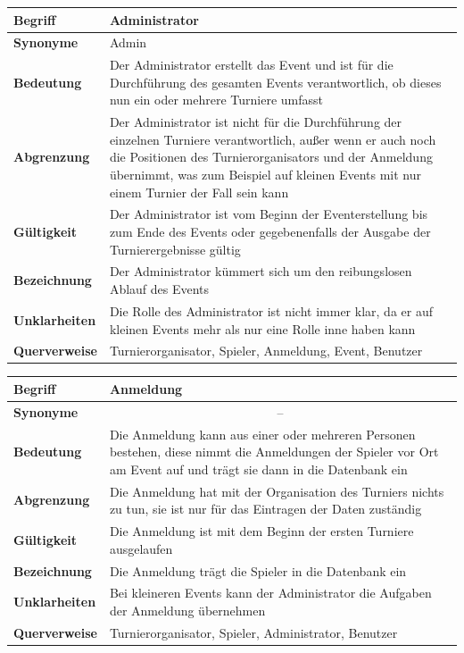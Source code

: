 \documentclass[11pt]{article}
\begin{document}
\begin{tabularx}{\textwidth}{| p{} | p{} |}
	\hline
	\textbf{Begriff} & Administrator\\
	\hline
	\textbf{Synonyme} & Admin\\
	\hline
	\textbf{Bedeutung} & Der Administrator erstellt das Event und ist für die Durchführung des gesamten Events verantwortlich, ob dieses nun ein oder mehrere Turniere umfasst\\
	\hline
	\textbf{Abgrenzung} & Der Administrator ist nicht für die Durchführung der einzelnen Turniere verantwortlich, außer wenn er auch noch die Positionen des Turnierorganisators und der Anmeldung übernimmt, was zum Beispiel auf kleinen Events mit nur einem Turnier der Fall sein kann\\
	\hline
	\textbf{Gültigkeit} & Der Administrator ist vom Beginn der Eventerstellung bis zum Ende des Events oder gegebenenfalls der Ausgabe der Turnierergebnisse gültig\\
	\hline
	\textbf{Bezeichnung} & Der Administrator kümmert sich um den reibungslosen Ablauf des Events\\
	\hline
	\textbf{Unklarheiten} & Die Rolle des Administrator ist nicht immer klar, da er auf kleinen Events mehr als nur eine Rolle inne haben kann\\
	\hline
	\textbf{Querverweise} &  Turnierorganisator, Spieler, Anmeldung, Event, Benutzer\\
	\hline
\end{tabularx}

\begin{tabularx}{\textwidth}{| p{} | p{} |}
	\hline
	\textbf{Begriff} & Anmeldung\\
	\hline
	\textbf{Synonyme} & \multicolumn{1}{c|}{--} \\
	\hline
	\textbf{Bedeutung} & Die Anmeldung kann aus einer oder mehreren Personen bestehen, diese nimmt die Anmeldungen der Spieler vor Ort am Event auf und trägt sie dann in die Datenbank ein\\
	\hline
	\textbf{Abgrenzung} & Die Anmeldung hat mit der Organisation des Turniers nichts zu tun, sie ist nur für das Eintragen der Daten zuständig\\
	\hline
	\textbf{Gültigkeit} & Die Anmeldung ist mit dem Beginn der ersten Turniere ausgelaufen\\
	\hline
	\textbf{Bezeichnung} & Die Anmeldung trägt die Spieler in die Datenbank ein\\
	\hline
	\textbf{Unklarheiten} & Bei kleineren Events kann der Administrator die Aufgaben der Anmeldung übernehmen \\
	\hline
	\textbf{Querverweise} &  Turnierorganisator, Spieler, Administrator, Benutzer\\
	\hline
\end{tabularx}
\end{document}
